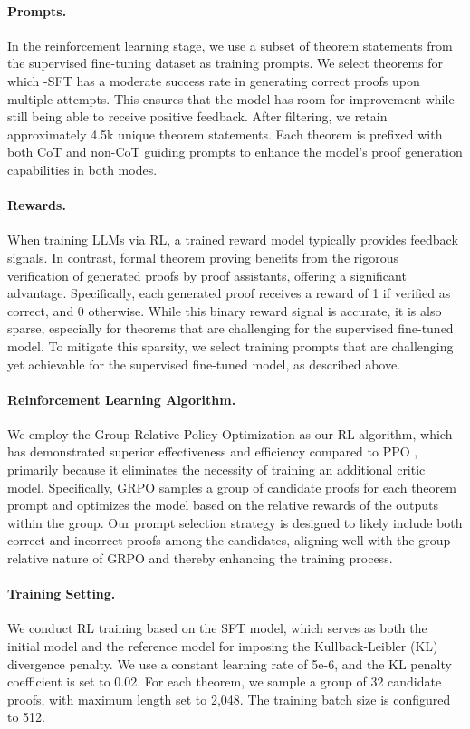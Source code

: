 \paragraph{Prompts.}
In the reinforcement learning stage, we use a subset of theorem statements from the supervised fine-tuning dataset as training prompts. We select theorems for which \thiswork-SFT has a moderate success rate in generating correct proofs upon multiple attempts. This ensures that the model has room for improvement while still being able to receive positive feedback. After filtering, we retain approximately 4.5k unique theorem statements. Each theorem is prefixed with both CoT and non-CoT guiding prompts to enhance the model's proof generation capabilities in both modes.

\paragraph{Rewards.}
When training LLMs via RL, a trained reward model typically provides feedback signals. In contrast, formal theorem proving benefits from the rigorous verification of generated proofs by proof assistants, offering a significant advantage. Specifically, each generated proof receives a reward of 1 if verified as correct, and 0 otherwise. While this binary reward signal is accurate, it is also sparse, especially for theorems that are challenging for the supervised fine-tuned model. To mitigate this sparsity, we select training prompts that are challenging yet achievable for the supervised fine-tuned model, as described above.

\paragraph{Reinforcement Learning Algorithm.}
We employ the Group Relative Policy Optimization \citep[GRPO;][]{shao2024deepseekmath} as our RL algorithm, which has demonstrated superior effectiveness and efficiency compared to PPO \citep{schulman2017proximal}, primarily because it eliminates the necessity of training an additional critic model. Specifically, GRPO samples a group of candidate proofs for each theorem prompt and optimizes the model based on the relative rewards of the outputs within the group. Our prompt selection strategy is designed to likely include both correct and incorrect proofs among the candidates, aligning well with the group-relative nature of GRPO and thereby enhancing the training process.

\paragraph{Training Setting. }
We conduct RL training based on the SFT model, which serves as both the initial model and the reference model for imposing the Kullback-Leibler (KL) divergence penalty. We use a constant learning rate of 5e-6, and the KL penalty coefficient is set to 0.02. For each theorem, we sample a group of 32 candidate proofs, with maximum length set to 2,048. The training batch size is configured to 512.

